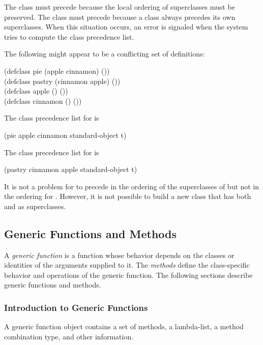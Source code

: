 The class  must precede  because the local
ordering of superclasses must be preserved.  The class  must
precede  because a class always precedes its own
superclasses.  When this situation occurs, an error is signaled when
the system tries to compute the class precedence list.

The following might appear to be a conflicting set of definitions:

\begin{lisp}
(defclass pie (apple cinnamon) ()) \\
(defclass pastry (cinnamon apple) ()) \\
(defclass apple () ()) \\
(defclass cinnamon () ())
\end{lisp}

The class precedence list for  is
\begin{lisp}
(pie apple cinnamon standard-object t)
\end{lisp}

The class precedence list for  is
\begin{lisp}
(pastry cinnamon apple standard-object t)
\end{lisp}

It is not a problem for  to precede  in the
ordering of the superclasses of  but not in the ordering for
.  However, it is not possible to build a new class that
has both  and  as superclasses.


\subsection{Generic Functions and Methods}

A \emph{generic function\/} is a function whose behavior depends on
the classes or identities of the arguments supplied to it.  The \emph{methods}
define the class-specific behavior and operations of the 
generic function. The following sections describe generic functions
and methods.

\subsubsection{Introduction to Generic Functions}

A generic function object contains a set of methods, a
lambda-list, a method combination type, and other information.

